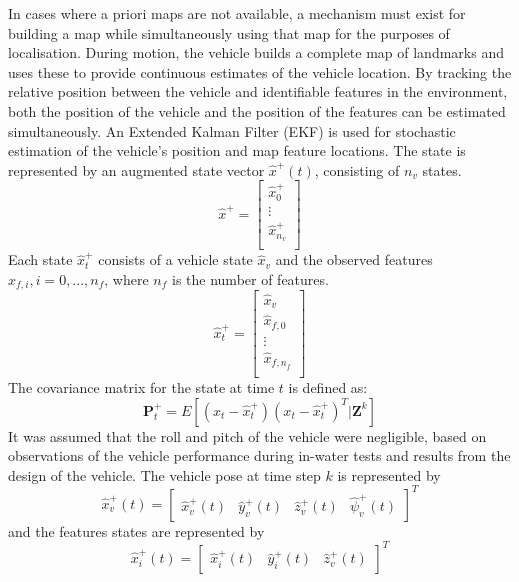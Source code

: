 In cases where a priori maps are not available, a mechanism must exist for building a map while simultaneously using that map for the purposes of localisation.
During motion, the vehicle builds a complete map of landmarks and uses these to provide continuous estimates of the vehicle location.
By tracking the relative position between the vehicle and identifiable features in the environment, both the position of the vehicle and the position of the features can be estimated simultaneously.
An Extended Kalman Filter (EKF) is used for stochastic estimation of the vehicle's position and map feature locations.
The state is represented by an augmented state vector $\hat{x}^{+}(t)$, consisting of $n_v$ states.
\begin{equation}
\hat{x}^+ = \left[ {
\begin{array}{c} \hat{x}_0^+ \\ \vdots \\ \hat{x}_{n_v}^+ \\  \end{array}
} \right]
\end{equation}
Each state $\hat{x}_t^+$ consists of a vehicle state $\hat{x}_v$ and the observed features $\hat{x}_{f, i}, i = 0, ..., n_f$, where $n_f$ is the number of features.
\begin{equation}
\hat{x}_t^+ = \left[ {
\begin{array}{c} \hat{x}_v \\ \hat{x}_{f, 0} \\ \vdots \\ \hat{x}_{f, n_f} \\  \end{array}
} \right]
\end{equation}
The covariance matrix for the state at time $t$ is defined as:
\begin{equation}
\textbf{P}^+_t = E[(x_t - \hat{x}^+_t)(x_t - \hat{x}^+_t)^T | \textbf{Z}^k]
\end{equation}
It was assumed that the roll and pitch of the vehicle were negligible, based on observations of the vehicle performance during in-water tests and results from the design of the vehicle.
The vehicle pose at time step $k$ is represented by
\begin{equation}
\hat{x}^+_v(t) = \left[ \begin{array}{cccc} \hat{x}^+_v(t) & \hat{y}^+_v(t) & \hat{z}^+_v(t) & \hat{\psi}^+_v(t) \end{array}\right]^T
\end{equation}
and the features states are represented by
\begin{equation}
\hat{x}^+_i(t) = \left[ \begin{array}{ccc} \hat{x}^+_i(t) & \hat{y}^+_i(t) & \hat{z}^+_v(t) \end{array}\right]^T
\end{equation}


